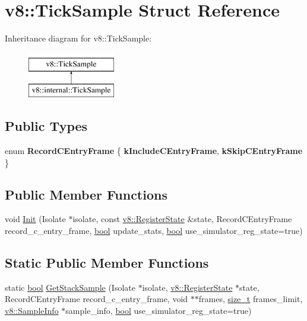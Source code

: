\hypertarget{structv8_1_1TickSample}{}\section{v8\+:\+:Tick\+Sample Struct Reference}
\label{structv8_1_1TickSample}
Inheritance diagram for v8\+:\+:Tick\+Sample\+:\begin{figure}[H]
\begin{center}
\leavevmode
\includegraphics[height=2.000000cm]{structv8_1_1TickSample}
\end{center}
\end{figure}
\subsection*{Public Types}
\begin{DoxyCompactItemize}
\item 
\mbox{\label{structv8_1_1TickSample_ae3223c2114f7140f8af1793802b94d42}} 
enum {\bfseries Record\+C\+Entry\+Frame} \{ {\bfseries k\+Include\+C\+Entry\+Frame}, 
{\bfseries k\+Skip\+C\+Entry\+Frame}
 \}
\end{DoxyCompactItemize}
\subsection*{Public Member Functions}
\begin{DoxyCompactItemize}
\item 
void \mbox{\hyperlink{structv8_1_1TickSample_a71cbf35dee4a229fdcd3c1a4c1bbd87d}{Init}} (Isolate $\ast$isolate, const \mbox{\hyperlink{structv8_1_1RegisterState}{v8\+::\+Register\+State}} \&state, Record\+C\+Entry\+Frame record\+\_\+c\+\_\+entry\+\_\+frame, \mbox{\hyperlink{classbool}{bool}} update\+\_\+stats, \mbox{\hyperlink{classbool}{bool}} use\+\_\+simulator\+\_\+reg\+\_\+state=true)
\end{DoxyCompactItemize}
\subsection*{Static Public Member Functions}
\begin{DoxyCompactItemize}
\item 
static \mbox{\hyperlink{classbool}{bool}} \mbox{\hyperlink{structv8_1_1TickSample_a4cf2b58bf6ef55494723cceb35f8cc9b}{Get\+Stack\+Sample}} (Isolate $\ast$isolate, \mbox{\hyperlink{structv8_1_1RegisterState}{v8\+::\+Register\+State}} $\ast$state, Record\+C\+Entry\+Frame record\+\_\+c\+\_\+entry\+\_\+frame, void $\ast$$\ast$frames, \mbox{\hyperlink{classsize__t}{size\+\_\+t}} frames\+\_\+limit, \mbox{\hyperlink{structv8_1_1SampleInfo}{v8\+::\+Sample\+Info}} $\ast$sample\+\_\+info, \mbox{\hyperlink{classbool}{bool}} use\+\_\+simulator\+\_\+reg\+\_\+state=true)
\end{DoxyCompactItemize}
